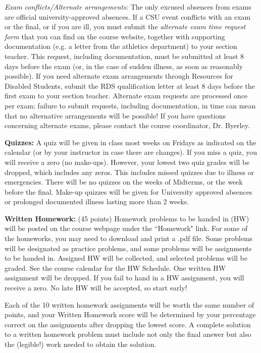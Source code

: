 \documentclass[11pt]{article}
\begin{document}
\textit{Exam conflicts/Alternate arrangements:} The only excused absences from exams are official university-approved absences. If a CSU event conflicts with an exam or the final, or if you are ill, you must submit the \textit{alternate exam time request form} that you can find on
the course website, together with supporting documentation (e.g. a letter from the athletics department) to your section teacher. This request, including documentation, must be submitted at least 8 days
before the exam (or, in the case of sudden illness, as soon as reasonably possible).
If you need alternate exam arrangements through Resources for Disabled Students, submit the RDS
qualification letter at least 8 days
before the first exam to your section teacher. Alternate exam requests are processed once per exam;
failure to submit requests, including documentation, in time can mean that no alternative arrangements
will be possible!
If you have questions concerning alternate exams, please contact the course coordinator, Dr. Byerley.

\vspace{3mm}

\textbf{Quizzes:}  A quiz will be given in class most weeks on Fridays as indicated on the calendar (or by your instructor in case there are changes). If you miss a quiz, you will receive a zero (no make-ups). However, your lowest two quiz grades will be dropped, which includes any zeros. This includes missed quizzes due to illness or emergencies. There will be no quizzes on the weeks of Midterms, or the week before the final. Make-up quizzes will be given for University approved absences or prolonged documented illness lasting more than 2 weeks. 

\vspace{3mm}




\textbf{Written Homework:}  (45 points) Homework problems to be handed in (HW) will be posted on the course webpage under the ``Homework" link.  For some of the homeworks, you may need to download and print a .pdf file.    
 Some problems will be designated as practice problems, and some problems will be assignments to be handed in. Assigned HW will be collected, and selected problems will be graded. See the course calendar for the HW Schedule. One written HW assignment will be dropped. If you fail to hand in a HW assignment, you will receive a zero. No late HW will be accepted, so start early!  
   
   Each of the 10 written homework assignments will be worth the same number of points, and your Written Homework score will be determined by your percentage correct on the assignments after dropping the lowest score.  A complete solution to a written homework problem must include not only the final answer but also the (legible!) work needed to obtain the solution.   
   
\end{document}

